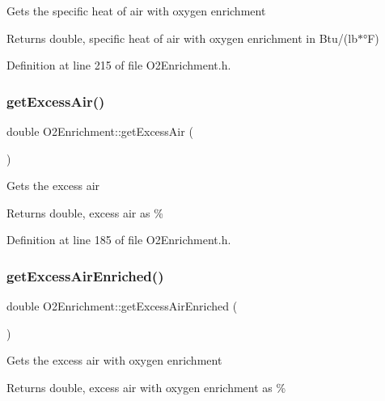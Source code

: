 Gets the specific heat of air with oxygen enrichment \begin{DoxyReturn}{Returns}
double, specific heat of air with oxygen enrichment in Btu/(lb$\ast$°F) 
\end{DoxyReturn}


Definition at line 215 of file O2\+Enrichment.\+h.

\mbox{\label{class_o2_enrichment_aba7923d4967cc1258ad6d078822f699a}} 
\subsubsection{\texorpdfstring{get\+Excess\+Air()}{getExcessAir()}}
{\footnotesize\ttfamily double O2\+Enrichment\+::get\+Excess\+Air (\begin{DoxyParamCaption}{ }\end{DoxyParamCaption})\hspace{0.3cm}{\ttfamily [inline]}}

Gets the excess air \begin{DoxyReturn}{Returns}
double, excess air as \% 
\end{DoxyReturn}


Definition at line 185 of file O2\+Enrichment.\+h.

\mbox{\label{class_o2_enrichment_ad6e95234bd10eafb98a741e1bd75be58}} 
\subsubsection{\texorpdfstring{get\+Excess\+Air\+Enriched()}{getExcessAirEnriched()}}
{\footnotesize\ttfamily double O2\+Enrichment\+::get\+Excess\+Air\+Enriched (\begin{DoxyParamCaption}{ }\end{DoxyParamCaption})\hspace{0.3cm}{\ttfamily [inline]}}

Gets the excess air with oxygen enrichment \begin{DoxyReturn}{Returns}
double, excess air with oxygen enrichment as \% 
\end{DoxyReturn}


